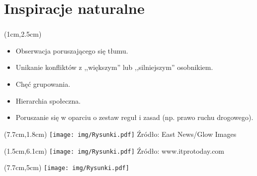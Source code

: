 \documentclass{beamer}
\begin{document}
\section{Inspiracje naturalne}
\begin{frame}
\frametitle{\secname}


\begin{textblock*}{6.5cm}(1cm,2.5cm) %
\footnotesize
\begin{itemize}
	\item Obserwacja poruszającego się tłumu.
	\item Unikanie konfliktów z ,,większym'' lub ,,silniejszym'' osobnikiem.
	\item Chęć grupowania.
	\item Hierarchia społeczna.	
	\item Poruszanie się w oparciu o zestaw reguł i zasad (np. prawo ruchu drogowego).
\end{itemize}
\end{textblock*}

\begin{textblock*}{5cm}(7.7cm,1.8cm) %
	\texttt{[image: img/Rysunki.pdf]}
	\tiny{Źródło: East News/Glow Images}
\end{textblock*}

\begin{textblock*}{6cm}(1.5cm,6.1cm) %
	\texttt{[image: img/Rysunki.pdf]}
	\tiny{Źródło: www.itprotoday.com}
\end{textblock*}

\begin{textblock*}{5cm}(7.7cm,5cm) %
	\texttt{[image: img/Rysunki.pdf]}
\end{textblock*}

\end{frame}
\end{document}

